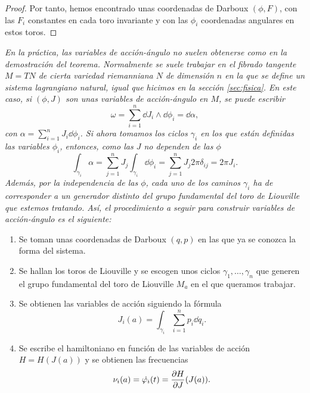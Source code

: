 \begin{proof}
Por tanto, hemos encontrado unas coordenadas de Darboux $(\phi,F)$, con las $F_i$ constantes en cada toro invariante y con las $\phi_i$ coordenadas angulares en estos toros. 
\end{proof}

\begin{obs}
  \em
  En la práctica, las variables de acción-ángulo no suelen obtenerse como en la demostración del teorema. Normalmente se suele trabajar en el fibrado tangente $M=TN$ de cierta variedad riemanniana $N$ de dimensión $n$ en la que se define un sistema lagrangiano natural, igual que hicimos en la sección \ref{sec:fisica}. En este caso, si $(\phi,J)$ son unas variables de acción-ángulo en $M$, se puede escribir
\begin{equation*}
  \omega=\sum_{i=1}^n \dd J_i \wedge \dd \phi_i = \dd \alpha,
\end{equation*}
con $\alpha=\sum_{i=1}^n J_i \dd \phi_i$. Si ahora tomamos los ciclos $\gamma_i$ en los que están definidas las variables $\phi_i$, entonces, como las $J$ no dependen de las $\phi$
\begin{equation*}
  \int_{\gamma_i} \alpha = \sum_{j=1}^n J_j \int_{\gamma_i}\dd \phi_i = \sum_{j=1}^n J_j 2\pi \delta_{ij}= 2\pi J_i.
\end{equation*}
Además, por la independencia de las $\phi$, cada uno de los caminos $\gamma_i$ ha de corresponder a un generador distinto del grupo fundamental del toro de Liouville que estemos tratando.
Así, el procedimiento a seguir para construir variables de acción-ángulo es el siguiente:
\begin{enumerate}
  \item Se toman unas coordenadas de Darboux $(q,p)$ en las que ya se conozca la forma del sistema.
  \item Se hallan los toros de Liouville y se escogen unos ciclos $\gamma_1,\dots,\gamma_n$ que generen el grupo fundamental del toro de Liouville $M_a$ en el que queramos trabajar.
  \item Se obtienen las variables de acción siguiendo la fórmula
    \begin{equation*}
      J_i(a)=\int_{\gamma_i} \sum_{i=1}^n p_i \dd q_i.
    \end{equation*}
  \item Se escribe el hamiltoniano en función de las variables de acción $H=H(J(a))$ y se obtienen las frecuencias 
    \begin{equation*}
      \nu_i(a)= \dot{\varphi_i}(t)=\frac{\partial H}{\partial J}(J(a)).
    \end{equation*}
\end{enumerate}
\end{obs}

